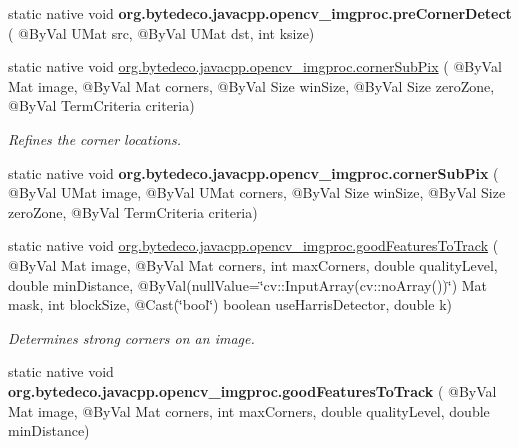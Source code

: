 \begin{DoxyCompactItemize}
\item 
\mbox{\label{group__imgproc__feature_ga3366cf2bc64fdfa8d85d143c2ed3e428}} 
static native void {\bfseries org.\+bytedeco.\+javacpp.\+opencv\+\_\+imgproc.\+pre\+Corner\+Detect} ( @By\+Val U\+Mat src, @By\+Val U\+Mat dst, int ksize)
\item 
static native void \hyperlink{group__imgproc__feature_ga45fec6a2998978719aaedb9aad2cbae6}{org.\+bytedeco.\+javacpp.\+opencv\+\_\+imgproc.\+corner\+Sub\+Pix} ( @By\+Val Mat image, @By\+Val Mat corners, @By\+Val Size win\+Size, @By\+Val Size zero\+Zone, @By\+Val Term\+Criteria criteria)
\begin{DoxyCompactList}\small\item\em Refines the corner locations. \end{DoxyCompactList}\item 
\mbox{\label{group__imgproc__feature_ga5aeeb78f004f05e49f77d7f2e12f9b6e}} 
static native void {\bfseries org.\+bytedeco.\+javacpp.\+opencv\+\_\+imgproc.\+corner\+Sub\+Pix} ( @By\+Val U\+Mat image, @By\+Val U\+Mat corners, @By\+Val Size win\+Size, @By\+Val Size zero\+Zone, @By\+Val Term\+Criteria criteria)
\item 
static native void \hyperlink{group__imgproc__feature_gac59ef9f79071cae35c509e388d80e4f5}{org.\+bytedeco.\+javacpp.\+opencv\+\_\+imgproc.\+good\+Features\+To\+Track} ( @By\+Val Mat image, @By\+Val Mat corners, int max\+Corners, double quality\+Level, double min\+Distance, @By\+Val(null\+Value=\char`\"{}cv\+::\+Input\+Array(cv\+::no\+Array())\char`\"{}) Mat mask, int block\+Size, @Cast(\char`\"{}bool\char`\"{}) boolean use\+Harris\+Detector, double k)
\begin{DoxyCompactList}\small\item\em Determines strong corners on an image. \end{DoxyCompactList}\item 
\mbox{\label{group__imgproc__feature_ga02fc9b1a1eb2dce3ddf7df025babc96b}} 
static native void {\bfseries org.\+bytedeco.\+javacpp.\+opencv\+\_\+imgproc.\+good\+Features\+To\+Track} ( @By\+Val Mat image, @By\+Val Mat corners, int max\+Corners, double quality\+Level, double min\+Distance)
\item 
\mbox{\label{group__imgproc__feature_ga91f0cf3b02909488de7edd9e03f38bda}} 

\end{DoxyCompactItemize}
